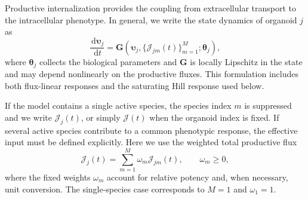 \documentclass[pdflatex,sn-mathphys-num]{sn-jnl}
\numberwithin{equation}{section}
\theoremstyle{thmstyleone}%
\theoremstyle{definition}
\theoremstyle{remark}
\newcommand{\dd}{\,\mathrm{d}}
\begin{document}
Productive internalization provides the coupling from extracellular transport to the intracellular phenotype. In general, we write the state dynamics of organoid $j$ as
\begin{equation*}
\frac{\dd\boldsymbol\upsilon_j}{\dd t}
=
\mathbf G\!\left(
\boldsymbol\upsilon_j,
\{\mathcal J_{jm}(t)\}_{m=1}^{M};
\boldsymbol\theta_j
\right),
\end{equation*}
where $\boldsymbol\theta_j$ collects the biological parameters and $\mathbf G$ is locally Lipschitz in the state and may depend nonlinearly on the productive fluxes. This formulation includes both flux-linear responses and the saturating Hill response used below.

If the model contains a single active species, the species index $m$ is suppressed and we write $\mathcal J_j(t)$, or simply $\mathcal J(t)$ when the organoid index is fixed. If several active species contribute to a common phenotypic response, the effective input must be defined explicitly. Here we use the weighted total productive flux
\begin{equation*}
\mathcal J_j(t)
=
\sum_{m=1}^{M}\omega_m\mathcal J_{jm}(t),
\qquad
\omega_m\geq0,
\end{equation*}
where the fixed weights $\omega_m$ account for relative potency and, when necessary, unit conversion. The single-species case corresponds to $M=1$ and $\omega_1=1$.
\end{document}

